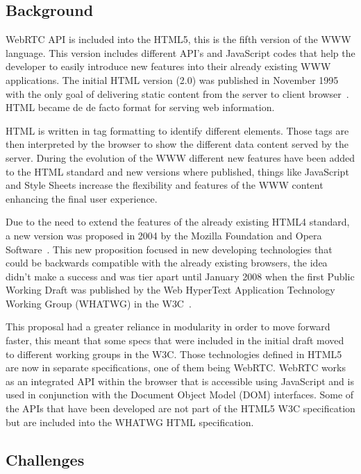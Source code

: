 \subsection{Background}

WebRTC API is included into the HTML5, this is the fifth version of the WWW language. This version includes different API's and JavaScript codes that help the developer to easily introduce new features into their already existing WWW applications. The initial HTML version (2.0) was published in November 1995 with the only goal of delivering static content from the server to client browser~\cite{html2IETF}. HTML became de de facto format for serving web information. 

HTML is written in tag formatting to identify different elements. Those tags are then interpreted by the browser to show the different data content served by the server. During the evolution of the WWW different new features have been added to the HTML standard and new versions where published, things like JavaScript and Style Sheets increase the flexibility and features of the WWW content enhancing the final user experience.

Due to the need to extend the features of the already existing HTML4 standard, a new version was proposed in 2004 by the Mozilla Foundation and Opera Software~\cite{initialHTML5proposition}. This new proposition focused in new developing technologies that could be backwards compatible with the already existing browsers, the idea didn't make a success and was tier apart until January 2008 when the first Public Working Draft was published by the Web HyperText Application Technology Working Group (WHATWG) in the W3C~\cite{firstHTML5draft}.

This proposal had a greater reliance in modularity in order to move forward faster, this meant that some specs that were included in the initial draft moved to different working groups in the W3C. Those technologies defined in HTML5 are now in separate specifications, one of them being WebRTC. WebRTC works as an integrated API within the browser that is accessible using JavaScript and is used in conjunction with the Document Object Model (DOM) interfaces. Some of the APIs that have been developed are not part of the HTML5 W3C specification but are included into the WHATWG HTML specification.

\subsection{Challenges}

